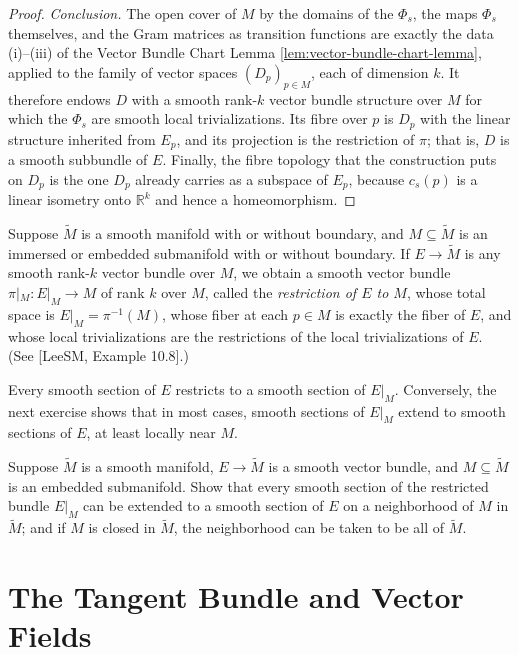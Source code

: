 \begin{proof}
\textit{Conclusion.} The open cover of $M$ by the domains of the $\Phi_s$, the maps $\Phi_s$ themselves, and the Gram matrices as transition functions are exactly the data (i)--(iii) of the Vector Bundle Chart Lemma \ref{lem:vector-bundle-chart-lemma}, applied to the family of vector spaces $(D_p)_{p \in M}$, each of dimension $k$. It therefore endows $D$ with a smooth rank-$k$ vector bundle structure over $M$ for which the $\Phi_s$ are smooth local trivializations. Its fibre over $p$ is $D_p$ with the linear structure inherited from $E_p$, and its projection is the restriction of $\pi$; that is, $D$ is a smooth subbundle of $E$. Finally, the fibre topology that the construction puts on $D_p$ is the one $D_p$ already carries as a subspace of $E_p$, because $c_s(p)$ is a linear isometry onto $\mathbb{R}^k$ and hence a homeomorphism.
\end{proof}

Suppose $\tilde{M}$ is a smooth manifold with or without boundary, and $M \subseteq \tilde{M}$ is an immersed or embedded submanifold with or without boundary. If $E \to \tilde{M}$ is any smooth rank-$k$ vector bundle over $M$, we obtain a smooth vector bundle $\pi|_M : E|_M \to M$ of rank $k$ over $M$, called the \emph{restriction of $E$ to $M$}, whose total space is $E|_M = \pi^{-1}(M)$, whose fiber at each $p \in M$ is exactly the fiber of $E$, and whose local trivializations are the restrictions of the local trivializations of $E$. (See [LeeSM, Example 10.8].)

Every smooth section of $E$ restricts to a smooth section of $E|_M$. Conversely, the next exercise shows that in most cases, smooth sections of $E|_M$ extend to smooth sections of $E$, at least locally near $M$.

\begin{exercise}
\label{exer:smooth-section-extension}
Suppose $\tilde{M}$ is a smooth manifold, $E \to \tilde{M}$ is a smooth vector bundle, and $M \subseteq \tilde{M}$ is an embedded submanifold. Show that every smooth section of the restricted bundle $E|_M$ can be extended to a smooth section of $E$ on a neighborhood of $M$ in $\tilde{M}$; and if $M$ is closed in $\tilde{M}$, the neighborhood can be taken to be all of $\tilde{M}$.
\end{exercise}

\section{The Tangent Bundle and Vector Fields}

